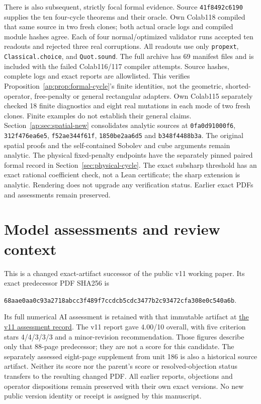 \documentclass[11pt]{article}
\begin{document}
There is also subsequent, strictly focal formal evidence. Source
\texttt{41f8492c6190} supplies the ten four-cycle theorems and their oracle.
Own Colab118 compiled that same source in two fresh clones; both actual oracle logs
and compiled module hashes agree. Each of four normal/optimized validator runs
accepted ten readouts and rejected three real corruptions. All readouts use only
\texttt{propext}, \texttt{Classical.choice}, and \texttt{Quot.sound}.
The full archive has 69 manifest files and is included with the failed Colab116/117
compiler attempts. Source hashes, complete logs and exact reports are allowlisted.
This verifies Proposition~\ref{ap:prop:formal-cycle}'s finite identities, not the
geometric, shorted-operator, free-penalty or general rectangular adapters.
Own Colab115 separately checked 18 finite diagnostics and eight real mutations in
each mode of two fresh clones. Finite examples do not establish their general claims.
Section~\ref{ap:sec:spatial-new} consolidates analytic sources at
\texttt{0fa0d91000f6}, \texttt{312f476ea6e5}, \texttt{f52ae344f61f},
\texttt{1850be2aa6d5} and \texttt{b348f4488b3a}. The original spatial proofs and the self-contained Sobolev and cube
arguments remain analytic. The physical fixed-penalty endpoints have the
separately pinned paired formal record in Section~\ref{sec:physical-cycle}.
The exact subsharp threshold has an exact rational coefficient check, not a
Lean certificate; the sharp extension is analytic. Rendering does not upgrade
any verification status. Earlier exact PDFs and assessments remain preserved.

\section{Model assessments and review context}\label{sec:model-context}
This is a changed exact-artifact successor of the public v11 working paper.
Its exact predecessor PDF SHA256 is
\begin{center}\scriptsize\texttt{68aae0aa0c93a2718abcc3f489f7ccdcb5cdc3477b2c93472cfa308e0c540a6b}.\end{center}
Its full numerical AI assessment is retained with that immutable artifact at
\href{https://airr.science/papers/ARR-2026-7EPM3V3DP796BBRR/versions/v11/\#model-assessments}{the v11 assessment record}.
The v11 report gave 4.00/10 overall, with five criterion stars 4/4/3/3/3
and a minor-revision recommendation. Those figures describe only that
88-page predecessor; they are not a score for this candidate.
The separately assessed eight-page supplement from unit 186 is also a
historical source artifact. Neither its score nor the parent's score or
resolved-objection status transfers to the resulting changed PDF. All earlier
reports, objections and operator dispositions remain preserved with their
own exact versions. No new public version identity or receipt is assigned
by this manuscript.
\end{document}
